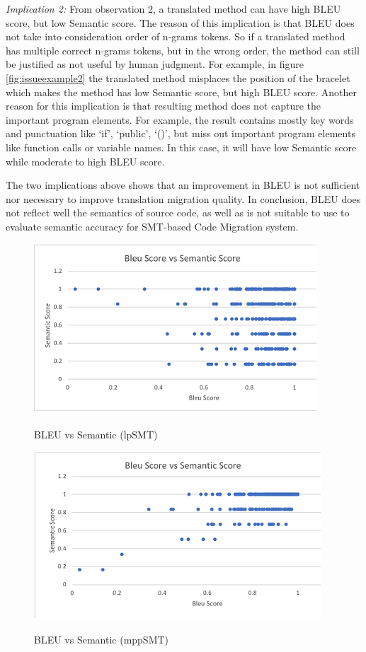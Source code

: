 \emph{Implication 2: }From observation 2, a translated method can have high BLEU score, but low Semantic score. The reason of this implication is that BLEU does not take into consideration order of n-grams tokens. So if a translated method has multiple correct n-grams tokens, but in the wrong order, the method can still be justified as not useful by human judgment. For example, in figure \ref{fig:issueexample2} the translated method misplaces the position of the bracelet which makes the method has low Semantic score, but high BLEU score. Another reason for this implication is that resulting method does not capture the important program elements. For example, the result contains mostly key words and punctuation like \lq if\rq, \lq public\rq, \lq()\rq, but miss out important program elements like function calls or variable names. In this case, it will have low Semantic score while moderate to high BLEU score. 

The two implications above shows that an improvement in BLEU is not sufficient nor necessary to improve translation migration quality. In conclusion, BLEU does not reflect well the semantics of source code, as well as is not suitable to use to evaluate semantic accuracy for SMT-based Code Migration system.

 
\begin{figure}
\caption{BLEU vs Semantic (lpSMT)}
\centering
\includegraphics{img/bleuvssemantic_lpSMT.png}
\label{fig:BleuSemlpSMT}
\end{figure}

\begin{figure}
\caption{BLEU vs Semantic (mppSMT)}
\centering
\includegraphics{img/bleuvssemantic_mppSMT.png}
\label{fig:BleuSemMppSMT}
\end{figure}

